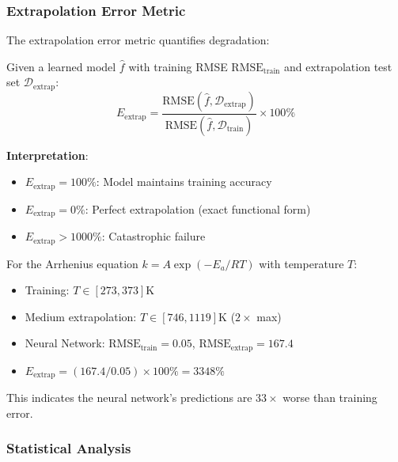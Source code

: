\documentclass[twoside,11pt]{article}
\begin{document}
\subsubsection{Extrapolation Error Metric}

The extrapolation error metric quantifies degradation:

\begin{definition}
\label{def:extrap_error}
Given a learned model $\hat{f}$ with training RMSE $\text{RMSE}_{\text{train}}$ and extrapolation test set $\mathcal{D}_{\text{extrap}}$:
\begin{equation}
E_{\text{extrap}} = \frac{\text{RMSE}(\hat{f}, \mathcal{D}_{\text{extrap}})}{\text{RMSE}(\hat{f}, \mathcal{D}_{\text{train}})} \times 100\%
\label{eq:extrap_error}
\end{equation}
\end{definition}

\textbf{Interpretation}:
\begin{itemize}
    \item $E_{\text{extrap}} = 100\%$: Model maintains training accuracy
    \item $E_{\text{extrap}} = 0\%$: Perfect extrapolation (exact functional form)
    \item $E_{\text{extrap}} > 1000\%$: Catastrophic failure
\end{itemize}

\begin{example}
For the Arrhenius equation $k = A \exp(-E_a/RT)$ with temperature $T$:
\begin{itemize}
    \item Training: $T \in [273, 373]$K
    \item Medium extrapolation: $T \in [746, 1119]$K ($2\times$ max)
    \item Neural Network: $\text{RMSE}_{\text{train}} = 0.05$, $\text{RMSE}_{\text{extrap}} = 167.4$
    \item $E_{\text{extrap}} = (167.4 / 0.05) \times 100\% = 3348\%$
\end{itemize}
This indicates the neural network's predictions are $33\times$ worse than training error.
\end{example}

\subsubsection{Statistical Analysis}
\end{document}
